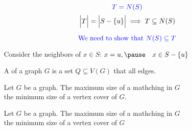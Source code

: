 \begin{frame}{}
  \begin{center}
    \[
      \textcolor{blue}{T = N(S)}
    \]
    \pause
    \[
      \Big\lvert T \Big\rvert = \Big\lvert S - \{u\} \Big\rvert \implies T \subseteq N(S)
    \]

    \pause
    \[
      \textcolor{blue}{\text{We need to show that } N(S) \subseteq T}
    \]

    \pause
    \begin{center}
      Consider the neighbors of $x \in S$: \pause
      $x = u, \pause\quad x \in S - \set{u}$
    \end{center}
  \end{center}
\end{frame}

\begin{frame}{}
  \begin{definitions}
    A  of a graph $G$ is a set $Q \subseteq V(G)$
    that  all edges.
  \end{definitions}

\end{frame}

\begin{frame}{}

  \pause
\end{frame}

\begin{frame}{}
  \begin{theorem}
    Let $G$ be a graph.
    The maximum size of a mathching in $G$ \\
    \red{$\le$} the minimum size of a vertex cover of $G$.
  \end{theorem}

  \pause

  \pause
  \begin{theorem}
    Let $G$ be a  graph.
    The maximum size of a mathching in $G$ \\
     the minimum size of a vertex cover of $G$
  \end{theorem}
\end{frame}

